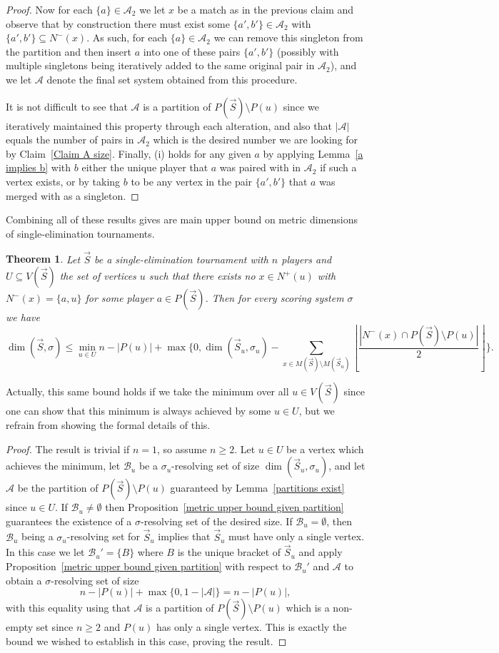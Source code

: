 \documentclass[12pt,letterpaper]{article}
\newtheorem{thm}{Theorem}[section]
\theoremstyle{definition}
\newcommand{\sig}{\sigma}
\renewcommand{\1}{\mathbbm{1}}
\newcommand{\sm}{\setminus}
\newcommand{\sub}{\subseteq}
\renewcommand{\c}[1]{\mathcal{#1}}
\newcommand{\tour}{\vec{S}}
\begin{document}
\begin{proof}
	Now for each $\{a\}\in \c{A}_2$ we let $x$ be a match as in the previous claim and observe that by construction there must exist some $\{a',b'\}\in \c{A}_2$ with $\{a',b'\}\sub N^-(x)$.  As such, for each $\{a\}\in \c{A}_2$ we can remove this singleton from the partition and then insert $a$ into one of these pairs $\{a',b'\}$ (possibly with multiple singletons being iteratively added to the same original pair in $\c{A}_2$), and we let $\c{A}$ denote the final set system obtained from this procedure.
	
	It is not difficult to see that $\c{A}$ is a partition of $P(\tour)\sm P(u)$ since we iteratively maintained this property through each alteration, and also that $|\c{A}|$ equals the number of pairs in $\c{A}_2$ which is the desired number we are looking for by Claim~\ref{Claim A size}.  Finally, (i) holds for any given $a$ by applying Lemma~\ref{a implies b} with $b$ either the unique player that $a$ was paired with in $\c{A}_2$ if such a vertex exists, or by taking $b$ to be any vertex in the pair $\{a',b'\}$ that $a$ was merged with as a singleton.
\end{proof}
Combining all of these results gives are main upper bound on metric dimensions of single-elimination tournaments.

\begin{thm}\label{upper bound technical}
	Let $\tour$ be a single-elimination tournament with $n$ players and $U\sub V(\tour)$ the set of vertices $u$ such that there exists no $x\in N^+(u)$ with $N^-(x)=\{a,u\}$ for some player $a\in P(\tour)$.  Then for every scoring system $\sig$ we have
	\[\dim(\tour,\sig)\le \min_{u\in U} n-|P(u)|+\max\{0,\dim(\tour_u,\sig_u)- \sum_{x\in M(\tour)\sm M(\tour_u)} \left\lfloor \frac{|N^-(x)\cap P(\tour)\sm P(u)|}{2} \right\rfloor\}.\]
\end{thm}
Actually, this same bound holds if we take the minimum over all $u\in V(\tour)$ since one can show that this minimum is always achieved by some $u\in U$, but we refrain from showing the formal details of this.
\begin{proof}
	The result is trivial if $n=1$, so assume $n\ge 2$.  Let $u\in U$ be a vertex which achieves the minimum, let $\c{B}_u$ be a $\sig_u$-resolving set of size $\dim(\tour_u,\sig_u)$, and let $\c{A}$ be the partition of $P(\tour)\sm P(u)$ guaranteed by Lemma~\ref{partitions exist} since $u\in U$.  If $\c{B}_u\ne \emptyset$ then Proposition~\ref{metric upper bound given partition} guarantees the existence of a $\sig$-resolving set of the desired size.  If $\c{B}_u=\emptyset$, then $\c{B}_u$ being a $\sig_u$-resolving set for $\tour_u$ implies that $\tour_u$ must have only a single vertex.  In this case we let $\c{B}_u'=\{B\}$ where $B$ is the unique bracket of $\tour_u$ and apply Proposition~\ref{metric upper bound given partition} with respect to $\c{B}_u'$ and $\c{A}$ to obtain a $\sig$-resolving set of size 
	\[n-|P(u)|+\max\{0,1-|\c{A}|\}=n-|P(u)|,\]
	with this equality using that $\c{A}$ is a partition of $P(\tour)\sm P(u)$ which is a non-empty set since $n\ge 2$ and $P(u)$ has only a single vertex.  This is exactly the bound we wished to establish in this case, proving the result.
\end{proof}
\end{document}
